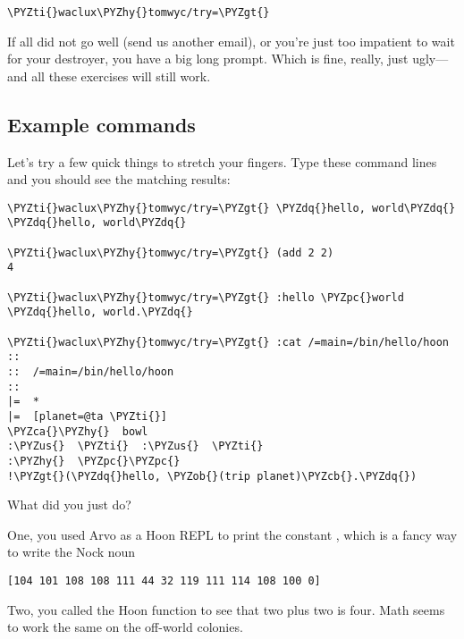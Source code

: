 \begin{framed_shaded}
\begin{Verbatim}[fontsize=\relsize{-2.5},fontseries=b,commandchars=\\\{\}]
\PYZti{}waclux\PYZhy{}tomwyc/try=\PYZgt{}
\end{Verbatim}
\end{framed_shaded}
If all did not go well (send us another email), or you're just
too impatient to wait for your destroyer, you have a big long
prompt.  Which is fine, really, just ugly---and all these
exercises will still work.

\subsection{Example commands}

Let's try a few quick things to stretch your fingers.  Type these
command lines and you should see the matching results:

\begin{framed_shaded}
\begin{Verbatim}[fontsize=\relsize{-2.5},fontseries=b,commandchars=\\\{\}]
\PYZti{}waclux\PYZhy{}tomwyc/try=\PYZgt{} \PYZdq{}hello, world\PYZdq{}
\PYZdq{}hello, world\PYZdq{}

\PYZti{}waclux\PYZhy{}tomwyc/try=\PYZgt{} (add 2 2)
4

\PYZti{}waclux\PYZhy{}tomwyc/try=\PYZgt{} :hello \PYZpc{}world
\PYZdq{}hello, world.\PYZdq{}

\PYZti{}waclux\PYZhy{}tomwyc/try=\PYZgt{} :cat /=main=/bin/hello/hoon
::
::  /=main=/bin/hello/hoon
::
|=  *
|=  [planet=@ta \PYZti{}]
\PYZca{}\PYZhy{}  bowl
:\PYZus{}  \PYZti{}  :\PYZus{}  \PYZti{}
:\PYZhy{}  \PYZpc{}\PYZpc{}
!\PYZgt{}(\PYZdq{}hello, \PYZob{}(trip planet)\PYZcb{}.\PYZdq{})
\end{Verbatim}
\end{framed_shaded}
What did you just do?

One, you used Arvo as a Hoon REPL to print the constant , which is a fancy way to write the Nock noun

\begin{framed_shaded}
\begin{Verbatim}[fontsize=\relsize{-2.5},fontseries=b,commandchars=\\\{\}]
[104 101 108 108 111 44 32 119 111 114 108 100 0]
\end{Verbatim}
\end{framed_shaded}
Two, you called the Hoon  function to see that two plus two
is four.  Math seems to work the same on the off-world colonies.

